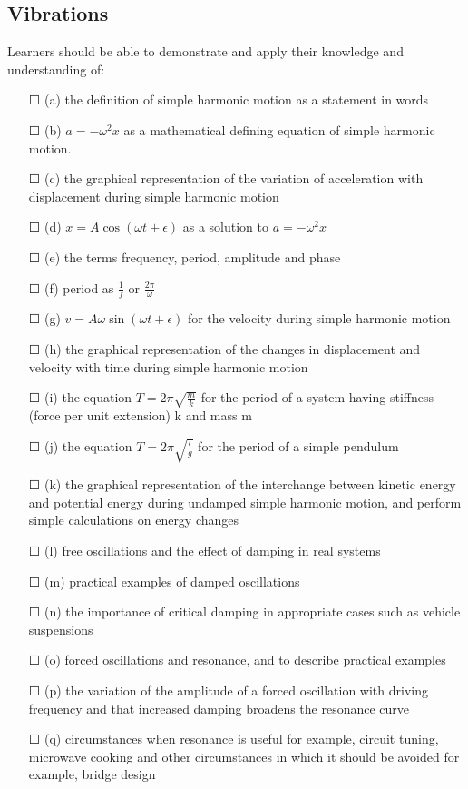 \subsection{Vibrations}
Learners should be able to demonstrate and apply their knowledge and
understanding of:
\begin{itemize}
	\item[\Large{$\Square$}](a) the definition of simple harmonic motion as a statement in words
	\item[\Large{$\Square$}](b) \(a=-\omega^{2} x\) as a mathematical defining equation of simple harmonic motion.
	\item[\Large{$\Square$}](c) the graphical representation of the variation of acceleration with displacement during simple harmonic motion
	\item[\Large{$\Square$}](d) \(x=A\cos(\omega t + \epsilon) \) as a solution to \(a=-\omega^{2} x\)
	\item[\Large{$\Square$}](e) the terms \sq frequency, \sq period, \sq amplitude and \sq phase
	\item[\Large{$\Square$}](f) period as \(\frac{1}{f}\) or \(\frac{2\pi}{\omega}\)
	\item[\Large{$\Square$}](g)  \(v=A\omega\sin(\omega t + \epsilon)\) for the velocity during simple harmonic motion
	\item[\Large{$\Square$}](h) the graphical representation of the changes in \sq displacement and \sq velocity with time during simple harmonic motion
	\item[\Large{$\Square$}](i) the equation \(T=2\pi \sqrt{\frac{m}{k}}\) for the period of a system having stiffness (force per unit extension) k and mass m
	\item[\Large{$\Square$}](j) the equation \(T=2\pi \sqrt{\frac{l}{g}}\) for the period of a simple pendulum
	\item[\Large{$\Square$}](k) the graphical representation of the interchange between kinetic energy and potential energy during undamped simple harmonic motion, and \sq perform simple calculations on energy changes
	\item[\Large{$\Square$}](l) free oscillations and the effect of damping in real systems
	\item[\Large{$\Square$}](m) practical examples of damped oscillations
	\item[\Large{$\Square$}](n) the importance of critical damping in appropriate cases such as vehicle
	suspensions
	\item[\Large{$\Square$}](o) forced oscillations and resonance, and to \sq describe practical examples
	\item[\Large{$\Square$}](p) the variation of the amplitude of a forced oscillation with driving frequency and \sq that increased damping broadens the resonance curve
	\item[\Large{$\Square$}](q) circumstances when resonance is useful for example, circuit tuning,
	microwave cooking and other circumstances in which it should be avoided for example, bridge design

\end{itemize}
